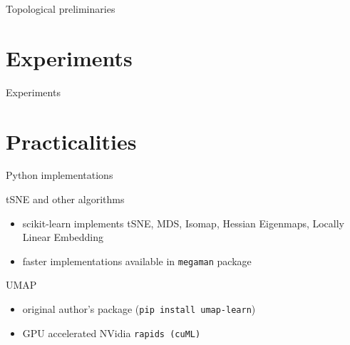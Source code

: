 \documentclass[unknownkeysallowed]{beamer}
\begin{document}
\begin{frame}{Topological preliminaries}

\end{frame}

\section{Experiments}

\begin{frame}{Experiments}

\end{frame}

\section{Practicalities}
\begin{frame}{Python implementations}

	\begin{block}{tSNE and other algorithms}
		\begin{itemize}
			\item scikit-learn implements tSNE, MDS, Isomap, Hessian Eigenmaps, Locally Linear Embedding
			\item faster implementations available in \texttt{megaman} package
		\end{itemize}
	\end{block}
	
	\begin{block}{UMAP}
		\begin{itemize}
			\item original author's package (\texttt{pip install umap-learn})
			\item GPU accelerated NVidia \texttt{rapids (cuML)} 
		\end{itemize}
	\end{block}
\end{frame}
\end{document}
